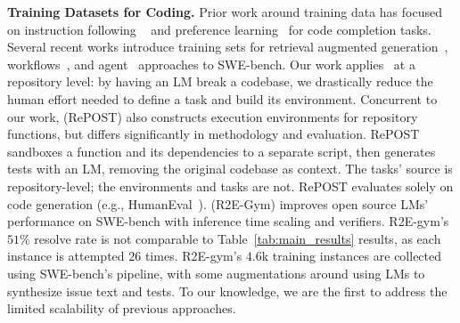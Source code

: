 \textbf{Training Datasets for Coding.}
Prior work around training data has focused on instruction following ~\citep{luo2023wizardcoderempoweringcodelarge,muennighoff_octopack_2024,shypula2024learningperformanceimprovingcodeedits,wei_selfcodealign_2024,wei2024magicoderempoweringcodegeneration,yu2024wavecoderwidespreadversatileenhancement} and preference learning~\citep{liu2024learningcodepreferencesynthetic,liu_dstc_2024} for code completion tasks.
Several recent works introduce training sets for retrieval augmented generation~\citep{jimenez_swe-bench_2024,xie2025swefixertrainingopensourcellms}, workflows~\citep{wei2025swerladvancingllmreasoning}, and agent~\citep{badertdinov2024scaling,ma2024lingmaswegptopendevelopmentprocesscentric,pan_training_2024,jain2025r2e-gym} approaches to SWE-bench.
Our work applies~\citet{haluptzok2023languagemodelsteachprogram} at a repository level: by having an LM break a codebase, we drastically reduce the human effort needed to define a task and build its environment.
Concurrent to our work, \citet{xie2025repostscalablerepositorylevelcoding} (RePOST) also constructs execution environments for repository functions, but differs significantly in methodology and evaluation.
RePOST sandboxes a function and its dependencies to a separate script, then generates tests with an LM, removing the original codebase as context.
The tasks' source is repository-level; the environments and tasks are not.
RePOST evaluates solely on code generation (e.g., HumanEval~\citep{chen_evaluating_2021}).
\citet{jain2025r2e-gym} (R2E-Gym) improves open source LMs' performance on SWE-bench with inference time scaling and verifiers.
R2E-gym's $51$\% resolve rate is not comparable to Table~\ref{tab:main_results} results, as each instance is attempted $26$ times.
R2E-gym's $4.6$k training instances are collected using SWE-bench's pipeline, with some augmentations around using LMs to synthesize issue text and tests.
To our knowledge, we are the first to address the limited scalability
of previous approaches.
